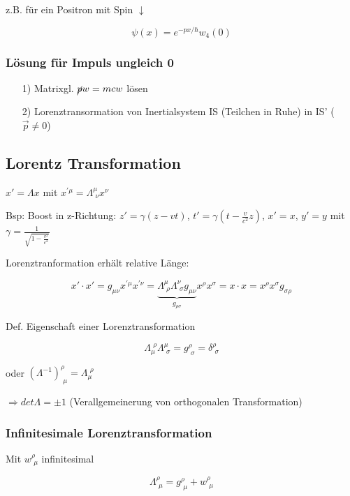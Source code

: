 z.B. für ein Positron mit Spin \(\downarrow\)

\[ \psi(x) = e^{-px/\hbar}w_4(0) \]

\subsubsection{Lösung für Impuls ungleich 0}

\begin{enumerate}
\item[1)] Matrixgl. \(\cancel p w = mcw\) lösen
\item[2)] Lorenztransormation von Inertialsystem IS (Teilchen in Ruhe) in IS' (\(\vec p\neq 0\))
\end{enumerate}

\subsection{Lorentz Transformation}

\(x' = \Lambda x\)  mit \(x^{'\mu}=\Lambda^\mu_{\,\, \nu}x^\nu\)

Bsp: Boost in z-Richtung: \(z' = \gamma(z-vt)\), \(t' = \gamma(t-\frac{v}{c^2}z)\), \(x' = x\), \(y'=y\) mit \(\gamma = \frac{1}{\sqrt{1-\frac{v^2}{c^2}}}\)

Lorenztranformation erhält relative Länge:

\[x'\cdot x' = g_{\mu\nu}x^{'\mu}x^{'\nu} = \underbrace{\Lambda^\mu_{\,\, \rho}  \Lambda^\nu_{\,\, \sigma}g_{\mu\nu}}_{g_{\rho\sigma}}x^\rho x^\sigma = x\cdot x = x^\rho x^\sigma g_{\sigma\rho}\]

Def. Eigenschaft einer Lorenztransformation

\[\Lambda_\mu^{\,\, \rho}\Lambda^\mu_{\,\,\sigma} = g^\rho_{\,\,\sigma} = \delta^\rho_{\,\, \sigma}  \]

oder \((\Lambda^{-1})^\rho_{\,\,\mu} = \Lambda_\mu^{\,\,\rho}\)

\(\Rightarrow det\Lambda = \pm 1\) (Verallgemeinerung von orthogonalen Transformation)

\subsubsection{Infinitesimale Lorenztransformation}

Mit \(w^\rho_{\,\,\mu}\) infinitesimal

\[\Lambda^\rho_{\,\,\mu} = g^\rho_{\,\,\mu}+w^\rho_{\,\,\mu} \]

